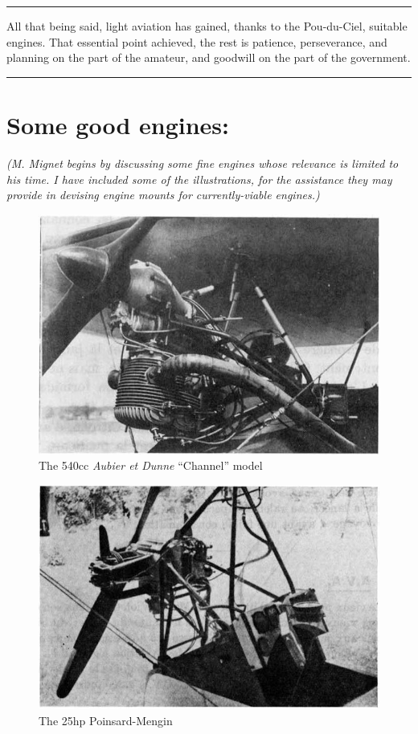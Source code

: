\documentclass{book}
\newcommand*\sectline{
  \vspace{5pt}
  \begin{center}
    \rule{0.5\linewidth}{\linethickness}
  \end{center}
  \vspace{5pt}
}
\begin{document}
\sectline

All that being said, light aviation has gained, thanks to the
Pou-du-Ciel, suitable engines.  That essential point achieved, the
rest is patience, perseverance, and planning on the part of the
amateur, and goodwill on the part of the government.

\sectline

\section{Some good engines:}

\textit{(M. Mignet begins by discussing some fine engines whose
  relevance is limited to his time.  I have included some of the
  illustrations, for the assistance they may provide in devising
  engine mounts for currently-viable engines.)}

\begin{figure}
  \includegraphics[width=\linewidth]{fig-51.jpg}
  \caption{The 540cc \textit{Aubier et Dunne} ``Channel'' model}
  \label{fig:fiftyone}
\end{figure}

\begin{figure}
  \includegraphics[width=\linewidth]{fig-52.jpg}
  \caption{The 25hp Poinsard-Mengin}
  \label{fig:fiftytwo}
\end{figure}
\end{document}
